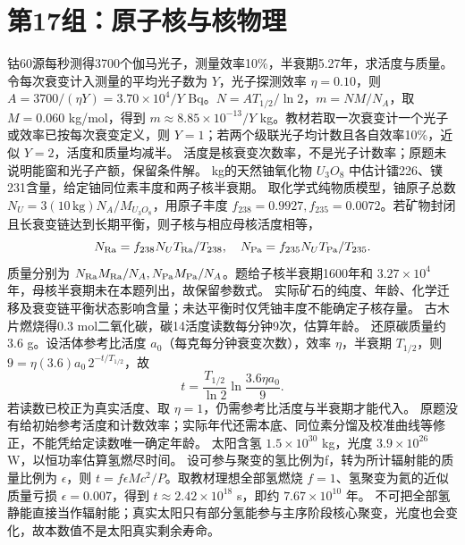 \section{第17组：原子核与核物理}
\problemtext 钴60源每秒测得3700个伽马光子，测量效率10\%，半衰期5.27年，求活度与质量。
\workings 令每次衰变计入测量的平均光子数为 $Y$，光子探测效率 $\eta=0.10$，则 $A=3700/(\eta Y)=3.70\times10^4/Y$ Bq。$N=AT_{1/2}/\ln2$，$m=NM/N_A$，取 $M=0.060$ kg/mol，得到 $m\approx8.85\times10^{-13}/Y$ kg。教材若取一次衰变计一个光子或效率已按每次衰变定义，则 $Y=1$；若两个级联光子均计数且各自效率10\%，近似 $Y=2$，活度和质量均减半。
\crosscheck 活度是核衰变次数率，不是光子计数率；原题未说明能窗和光子产额，保留条件解。
 kg的天然铀氧化物 $U_3O_8$ 中估计镭226、镤231含量，给定铀同位素丰度和两子核半衰期。
\workings 取化学式纯物质模型，铀原子总数 $N_U=3(10\,\mathrm{kg})N_A/M_{U_3O_8}$，用原子丰度 $f_{238}=0.9927,f_{235}=0.0072$。若矿物封闭且长衰变链达到长期平衡，则子核与相应母核活度相等，
\[
N_{\rm Ra}=f_{238}N_U T_{\rm Ra}/T_{238},\quad
N_{\rm Pa}=f_{235}N_U T_{\rm Pa}/T_{235}.
\]
质量分别为 $N_{\rm Ra}M_{\rm Ra}/N_A,N_{\rm Pa}M_{\rm Pa}/N_A$。题给子核半衰期1600年和 $3.27\times10^4$ 年，母核半衰期未在本题列出，故保留参数式。
\crosscheck 实际矿石的纯度、年龄、化学迁移及衰变链平衡状态影响含量；未达平衡时仅凭铀丰度不能确定子核存量。
\problemtext 古木片燃烧得0.3 mol二氧化碳，碳14活度读数每分钟9次，估算年龄。
\workings 还原碳质量约3.6 g。设活体参考比活度 $a_0$（每克每分钟衰变次数），效率 $\eta$，半衰期 $T_{1/2}$，则 $9=\eta(3.6)a_0\,2^{-t/T_{1/2}}$，故
\[
t=\frac{T_{1/2}}{\ln2}\ln\frac{3.6\eta a_0}{9}.
\]
若读数已校正为真实活度、取 $\eta=1$，仍需参考比活度与半衰期才能代入。
\crosscheck 原题没有给初始参考活度和计数效率；实际年代还需本底、同位素分馏及校准曲线等修正，不能凭给定读数唯一确定年龄。
\problemtext 太阳含氢 $1.5\times10^{30}$ kg，光度 $3.9\times10^{26}$ W，以恒功率估算氢燃尽时间。
\workings 设可参与聚变的氢比例为f，转为所计辐射能的质量比例为 $\epsilon$，则 $t=f\epsilon Mc^2/P$。取教材理想全部氢燃烧 $f=1$、氢聚变为氦的近似质量亏损 $\epsilon=0.007$，得到 $t\approx2.42\times10^{18}$ s，即约 $7.67\times10^{10}$ 年。
\crosscheck 不可把全部氢静能直接当作辐射能；真实太阳只有部分氢能参与主序阶段核心聚变，光度也会变化，故本数值不是太阳真实剩余寿命。

